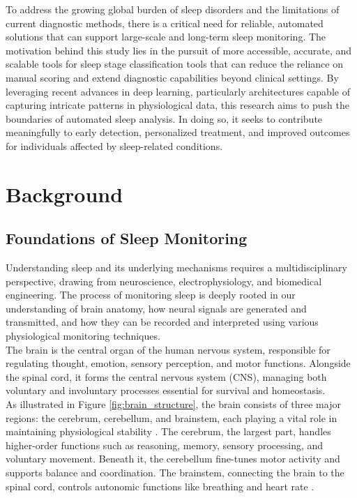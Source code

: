 To address the growing global burden of sleep disorders and the limitations of current diagnostic methods, there is a critical need for reliable, automated solutions that can support large-scale and long-term sleep monitoring. The motivation behind this study lies in the pursuit of more accessible, accurate, and scalable tools for sleep stage classification tools that can reduce the reliance on manual scoring and extend diagnostic capabilities beyond clinical settings. By leveraging recent advances in deep learning, particularly architectures capable of capturing intricate patterns in physiological data, this research aims to push the boundaries of automated sleep analysis. In doing so, it seeks to contribute meaningfully to early detection, personalized treatment, and improved outcomes for individuals affected by sleep-related conditions.
\section{Background}

\subsection{Foundations of Sleep Monitoring}

Understanding sleep and its underlying mechanisms requires a multidisciplinary perspective, drawing from neuroscience, electrophysiology, and biomedical engineering. The process of monitoring sleep is deeply rooted in our understanding of brain anatomy, how neural signals are generated and transmitted, and how they can be recorded and interpreted using various physiological monitoring techniques. \\

The brain is the central organ of the human nervous system, responsible for regulating thought, emotion, sensory perception, and motor functions. Alongside the spinal cord, it forms the central nervous system (CNS), managing both voluntary and involuntary processes essential for survival and homeostasis. \\

As illustrated in Figure \ref{fig:brain_structure}, the brain consists of three major regions: the cerebrum, cerebellum, and brainstem, each playing a vital role in maintaining physiological stability \parencite{kandel2000principles}. The cerebrum, the largest part, handles higher-order functions such as reasoning, memory, sensory processing, and voluntary movement. Beneath it, the cerebellum fine-tunes motor activity and supports balance and coordination. The brainstem, connecting the brain to the spinal cord, controls autonomic functions like breathing and heart rate \parencite{purves2013principles}.

